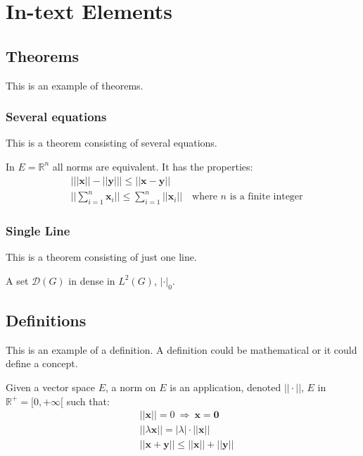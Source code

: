 \documentclass[12pt,fleqn,a4paper]{book} %
\begin{document}
    \chapter{In-text Elements}
    
    \section{Theorems}
    
    This is an example of theorems.
    
    \subsection{Several equations}
    This is a theorem consisting of several equations.
    
    \begin{theorem}
    In $E=\mathbb{R}^n$ all norms are equivalent. It has the properties:
    \begin{align}
    & \big| ||\mathbf{x}|| - ||\mathbf{y}|| \big|\leq || \mathbf{x}- \mathbf{y}||\\
    &  ||\sum_{i=1}^n\mathbf{x}_i||\leq \sum_{i=1}^n||\mathbf{x}_i||\quad\text{where $n$ is a finite integer}
    \end{align}
    \end{theorem}
    
    \subsection{Single Line}
    This is a theorem consisting of just one line.
    
    \begin{theorem}
    A set $\mathcal{D}(G)$ in dense in $L^2(G)$, $|\cdot|_0$. 
    \end{theorem}
    
    
    \section{Definitions}
    
    This is an example of a definition. A definition could be mathematical or it could define a concept.
    
    \begin{definition}
    Given a vector space $E$, a norm on $E$ is an application, denoted $||\cdot||$, $E$ in $\mathbb{R}^+=[0,+\infty[$ such that:
    \begin{align}
    & ||\mathbf{x}||=0\ \Rightarrow\ \mathbf{x}=\mathbf{0}\\
    & ||\lambda \mathbf{x}||=|\lambda|\cdot ||\mathbf{x}||\\
    & ||\mathbf{x}+\mathbf{y}||\leq ||\mathbf{x}||+||\mathbf{y}||
    \end{align}
    \end{definition}
    
\end{document}
